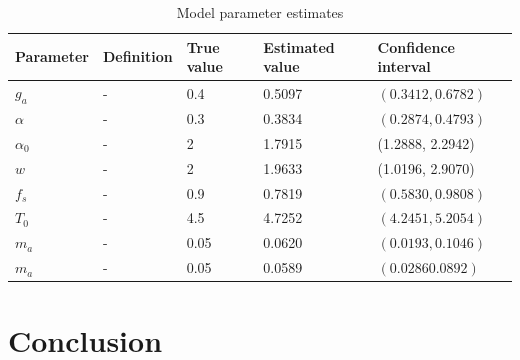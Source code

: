 \documentclass[12pt, table]{article}
\begin{document}
\begin{table}[H]
\small
\begin{center}
\begin{tabular}{lllll}
  \hline
  Parameter&Definition&True value&Estimated value& Confidence interval\\
  \hline
  $g_a$&-&0.4&0.5097&$(0.3412, 0.6782)$\\
  $\alpha$&-&0.3&0.3834&$(0.2874, 0.4793)$\\
  $\alpha_0$&-&2&1.7915&(1.2888, 2.2942)\\
  $w$&-&2&1.9633&(1.0196, 2.9070)\\
  $f_s$&-&0.9&0.7819&$(0.5830, 0.9808)$\\
  $T_0$&-&4.5&4.7252&$(4.2451, 5.2054)$\\
  $m_a$&-&0.05&0.0620&$(0.0193,  0.1046)$\\
  $m_a$&-&0.05&0.0589&$(0.0286 0.0892)$\\
  \hline
\end{tabular}
\end{center}
\caption{Model parameter estimates}
\label{table1}
\end{table}


\section{Conclusion}

 
\end{document}
